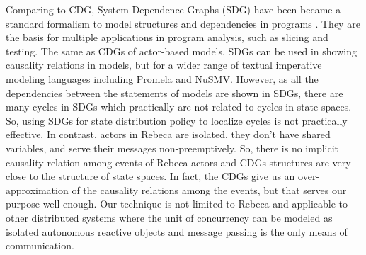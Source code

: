 Comparing to CDG, System Dependence Graphs (SDG) have been became a standard formalism to model structures and dependencies in programs \cite{DBLP:conf/scam/Graf10}. They are the basis for multiple applications in program analysis, such as slicing and testing. The same as CDGs of actor-based models, SDGs can be used in showing causality relations in models, but for a wider range of textual imperative modeling languages including Promela and NuSMV. However, as all the dependencies between the statements of models are shown in SDGs, there are many cycles in SDGs which practically are not related to cycles in state spaces. So, using SDGs for state distribution policy to localize cycles is not practically effective. In contrast, actors in Rebeca are isolated, they don't have shared variables, and serve their messages non-preemptively. So, there is no implicit causality relation among events of Rebeca actors and CDGs structures are very close to the structure of state spaces. In fact, the CDGs give us an over-approximation of the causality relations among the events, but that serves our purpose well enough. Our technique is not limited to Rebeca and applicable to other distributed systems where the unit of concurrency can be modeled as isolated autonomous reactive objects and message passing is the only means of communication. 

